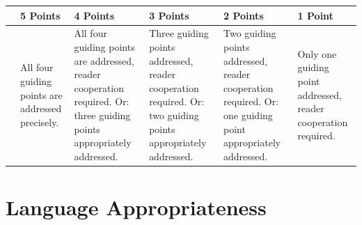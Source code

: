 \documentclass[a4paper,11pt]{article}
\begin{document}
            \begin{center}
                \small
                \begin{tabularx}{\textwidth}{|c|Y|Y|Y|Y|Y|}
    \hline
    & \textbf{5 Points} & \textbf{4 Points} & \textbf{3 Points} & \textbf{2 Points} & \textbf{1 Point} \\
    \hline
    
    
    &
    All four guiding points are addressed precisely.
    
    &
    All four guiding points are addressed, reader cooperation required.
    Or: three guiding points appropriately addressed.
    
    &
    Three guiding points addressed, reader cooperation required.
    Or: two guiding points appropriately addressed.
    
    &
    Two guiding points addressed, reader cooperation required.
    Or: one guiding point appropriately addressed.
    
    &
    Only one guiding point addressed, reader cooperation required.
    
    \\
    \hline
                \end{tabularx}
            \end{center}
            
            \newpage
    
    
    \section{Language Appropriateness}
        
\end{document}
